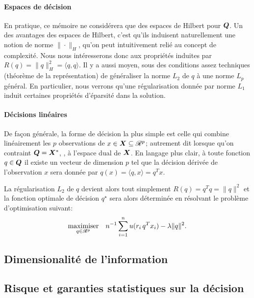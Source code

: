 \paragraph{Espaces de décision}

En pratique, ce mémoire ne considérera que des espaces de Hilbert pour $\Q$. Un des
avantages des espaces de Hilbert, c'est qu'ils induisent naturellement une notion de norme
$\|\cdot\|_H$, qu'on peut intuitivement relié au concept de complexité. Nous nous
intéresserons donc aux propriétés induites par $R(q) = \|q\|_H^2 = \langle q, q \rangle$. Il y a
aussi moyen, sous des conditions assez techniques (théorème de la représentation) de
généraliser la norme $L_2$ de $q$ à une norme $L_p$ général. En particulier, nous verrons
qu'une régularisation donnée par norme $L_1$ induit certaines propriétés d'éparsité dans
la solution.


\paragraph{Décisions linéaires}

De façon générale, la forme de décision la plus simple est celle qui combine linéairement
les $p$ observations de $x \in \X \subseteq \Re^p$; autrement dit lorsque qu'on contraint
$\Q = \X^*$, \ie, à l'espace dual de $\X$. En langage plus clair, à toute fonction
$q \in \Q$ il existe un vecteur de dimension $p$ tel que la décision dérivée de
l'observation $x$ sera donnée par $q(x) = \langle q, x \rangle = q^Tx$.

La régularisation $L_2$ de $q$ devient alors tout simplement $R(q) = q^Tq = \|q\|^2$ et la
fonction optimale de décision $q^\star$ sera alors déterminée en résolvant le problème
d'optimisation suivant:
\begin{equation}
  \maximizeEquation[q \in \Re^p]{n^{-1}\sumi u(r_i\,q^Tx_i) - \lambda \|q\|^2.}
\end{equation}



\subsection{Dimensionalité de l'information}




\subsection{Risque et garanties statistiques sur la décision}



